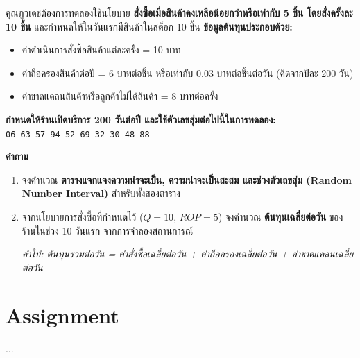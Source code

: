 \begin{example}
คุณภูวเดชต้องการทดลองใช้นโยบาย \textbf{สั่งซื้อเมื่อสินค้าคงเหลือน้อยกว่าหรือเท่ากับ 5 ชิ้น โดยสั่งครั้งละ 10 ชิ้น} และกำหนดให้ในวันแรกมีสินค้าในสต็อก 10 ชิ้น
\newpage
\textbf{ข้อมูลต้นทุนประกอบด้วย:}
\begin{itemize}
    \item ค่าดำเนินการสั่งซื้อสินค้าแต่ละครั้ง = 10 บาท
    \item ค่าถือครองสินค้าต่อปี = 6 บาทต่อชิ้น หรือเท่ากับ 0.03 บาทต่อชิ้นต่อวัน (คิดจากปีละ 200 วัน)
    \item ค่าขาดแคลนสินค้าหรือลูกค้าไม่ได้สินค้า = 8 บาทต่อครั้ง
\end{itemize}

\textbf{กำหนดให้ร้านเปิดบริการ 200 วันต่อปี และใช้ตัวเลขสุ่มต่อไปนี้ในการทดลอง:}\\
\texttt{06 63 57 94 52 69 32 30 48 88}

\vspace{1em}
\textbf{คำถาม}
\begin{enumerate}[label=\alph*)]
    \item จงคำนวณ \textbf{ตารางแจกแจงความน่าจะเป็น, ความน่าจะเป็นสะสม และช่วงตัวเลขสุ่ม (Random Number Interval)} สำหรับทั้งสองตาราง
    \item จากนโยบายการสั่งซื้อที่กำหนดไว้ ($Q = 10$, $ROP = 5$) จงคำนวณ \textbf{ต้นทุนเฉลี่ยต่อวัน} ของร้านในช่วง 10 วันแรก จากการจำลองสถานการณ์

    \textit{คำใบ้: ต้นทุนรวมต่อวัน = ค่าสั่งซื้อเฉลี่ยต่อวัน + ค่าถือครองเฉลี่ยต่อวัน + ค่าขาดแคลนเฉลี่ยต่อวัน}
\end{enumerate}
\end{example}
\newpage
\section*{Assignment}

...